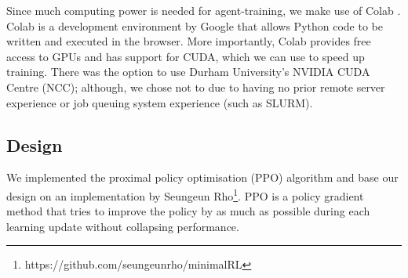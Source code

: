 \documentclass[12pt,a4paper]{article}
\begin{document}
Since much computing power is needed for agent-training, we make use of Colab \cite{Bisong2019}. Colab is a development environment by Google that allows Python code to be written and executed in the browser. More importantly, Colab provides free access to GPUs and has support for CUDA, which we can use to speed up training. There was the option to use Durham University's NVIDIA CUDA Centre (NCC); although, we chose not to due to having no prior remote server experience or job queuing system experience (such as SLURM).

\subsection{Design}
We implemented the proximal policy optimisation (PPO) algorithm \cite{DBLP:journals/corr/SchulmanWDRK17} and base our design on an implementation by Seungeun Rho\footnote{https://github.com/seungeunrho/minimalRL}. PPO is a policy gradient method that tries to improve the policy by as much as possible during each learning update without collapsing performance. 



\end{document}
